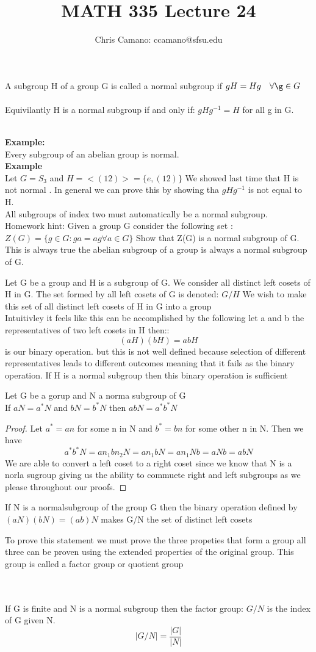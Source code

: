 \documentclass[11pt]{article}
\author{Chris Camano: ccamano@sfsu.edu}
\title{MATH 335  Lecture 24 }
\date
\theoremstyle{definition}  %
\newcommand{\block}[2]{\begin{tcolorbox}[title={#1}]{#2}\end{tcolorbox}}
\begin{document}
\maketitle
\block{Definition}{
A subgroup H of a group G is called a normal subgroup if $gH=Hg\quad \forall\g\in G$\\\\
Equivilantly H is a normal subgroup if and only if: $gHg^{-1}=H$ for all g in G.
}
\\
\textbf{Example:}\\
Every subgroup of an abelian group is normal. \\
\textbf{Example}\\
Let $G=S_3$ and $H=<(1 2)>=\{e,(1 2)\}$ We showed last time that H is not normal . In general we can prove this by showing tha $gHg^{-1}$ is not equal to H. \\
All subgroups of index two must automatically be a normal subgroup. \\
Homework hint: Given a group G consider the following set : $Z(G)=\{g\in G:ga=ag\forall a\in G\}$ Show that Z(G) is a normal subgroup of G. This is always true the abelian subgroup of a group is always a normal subgroup of G.\\
\block{Motivation: Factor Groups}{
Let G be a group and H is a subgroup of G. We consider all distinct left cosets of H in G.
The set formed by all left cosets of G is denoted:
$G/H$ We wish to make this set of all distinct left cosets of H in G into a group\\
Intuitivley it feels like this can be accomplished by the following let a and b the representatives of two left cosets in H then::
\[
  (aH)(bH)=abH
\]
is our binary operation. but this is not well defined because selection of different representatives leads to different outcomes meaning that it fails as the binary operation. If H is a normal subgroup then this binary operation is sufficient
}
\block{Definition}{
Let G be a gorup and N a norma subgroup of G\\
If $aN=a^*N$ and $bN=b^*N$ then $abN=a^*b^*N$

}
\begin{proof}
  Let $a^*=an$ for some n in N and $b^*=bn$ for some other n in N. Then we have
  \[
    a^*b^*N=an_1bn_2N=an_1bN=an_1Nb=aNb=abN
  \]
  We are able to convert a left coset to a right coset since we know that N is a norla sugroup giving us the ability to commuete right and left subgroups as we please throughout our proofs.
\end{proof}
\block{Theorem:}{
If N is a normalsubgroup of the group G then the binary operation defined by $(aN)(bN)=(ab)N$ makes G/N the set of distinct left cosets
}

To prove this statement we must prove the three propeties that form a group  all three can be proven using the extended properties of the original group. This group is called a factor group or quotient group


\\\\
If G is finite and N is a normal subgroup then the factor group: $G/N$ is the index of G given N. \[
  \left|G/N\right |=\frac{|G|}{|N|}
\]
\end{document}

